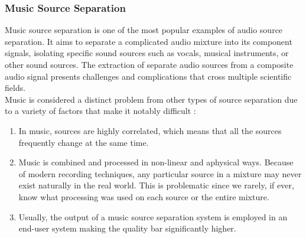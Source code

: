 \subsubsection{Music Source Separation}
Music source separation is one of the most popular examples of audio source separation. It aims to separate a complicated audio mixture into its component signals, isolating specific sound sources such as vocals, musical instruments, or other sound sources. The extraction of separate audio sources from a composite audio signal presents challenges and complications that cross multiple scientific fields.\\
Music is considered a distinct problem from other types of source separation due to a variety of factors that make it notably difficult \cite{cano2019}:
\begin{enumerate}
    \item In music, sources are highly correlated, which means that all the sources frequently change at the same time.
    \item Music is combined and processed in non-linear and aphysical ways. Because of modern recording techniques, any particular source in a mixture may never exist naturally in the real world. This is problematic since we rarely, if ever, know what processing was used on each source or the entire mixture.
    \item Usually, the output of a music source separation system is employed in an end-user system making the quality bar significantly higher.
\end{enumerate}

